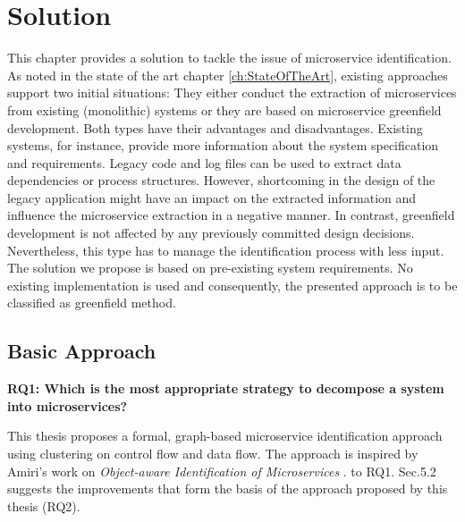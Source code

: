 \chapter{Solution}
\label{ch:Solution}
This chapter provides a solution to tackle the issue of microservice identification. As noted in the state of the art chapter \ref{ch:StateOfTheArt}, existing approaches support two initial situations: They either conduct the extraction of microservices from existing (monolithic) systems or they are based on microservice greenfield development. Both types have their advantages and disadvantages. Existing systems, for instance, provide more information about the system specification and requirements. Legacy code and log files can be used to extract data dependencies or process structures. However, shortcoming in the design of the legacy application might have an impact on the extracted information and influence the microservice extraction in a negative manner. In contrast, greenfield development is not affected by any previously committed design decisions. Nevertheless, this type has to manage the identification process with less input. \\
The solution we propose is based on pre-existing system requirements. No existing implementation is used and consequently, the presented approach is to be classified as greenfield method.\\



\section{Basic Approach}


\vspace{0.5cm}
\par
\begingroup
\leftskip=1cm
\rightskip=1cm

\noindent
\textbf{RQ1: Which is the most appropriate strategy to decompose a system into microservices? }

\endgroup
\vspace{0.5cm}




This thesis proposes a formal, graph-based microservice identification approach using clustering on control flow and data flow. The approach is  inspired by Amiri’s work on \textit{Object-aware Identification of Microservices} \cite{ObjectAwareAmiri}. 
to RQ1. Sec.5.2 suggests the improvements that form the basis of the approach
proposed by this thesis (RQ2). 


